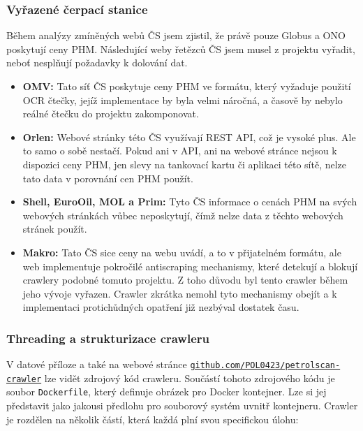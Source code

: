 \subsubsection{Vyřazené čerpací stanice}

Během analýzy zmíněných webů ČS jsem zjistil, že právě pouze Globus
a ONO poskytují ceny PHM. Následující weby řetězců ČS jsem musel
z projektu vyřadit, neboť nesplňují požadavky k dolování dat.

\begin{itemize}
    \item \textbf{OMV:} Tato síť ČS poskytuje ceny PHM ve formátu,
        který vyžaduje použití OCR čtečky, jejíž implementace
        by byla velmi náročná, a časově by nebylo reálné čtečku
        do projektu zakomponovat.
    \item \textbf{Orlen:} Webové stránky této ČS využívají REST API,
        což je vysoké plus. Ale to samo o sobě nestačí. Pokud ani
        v API, ani na webové stránce nejsou k dispozici ceny PHM,
        jen slevy na tankovací kartu či aplikaci této sítě, nelze
        tato data v porovnání cen PHM použít.
    \item \textbf{Shell, EuroOil, MOL a Prim:} Tyto ČS informace
        o cenách PHM na svých webových stránkách vůbec neposkytují,
        čímž nelze data z těchto webových stránek použít.
    \item \textbf{Makro:} Tato ČS sice ceny na webu uvádí, a to
        v přijatelném formátu, ale web implementuje pokročilé
        antiscraping mechanismy, které detekují a blokují crawlery
        podobné tomuto projektu. Z toho důvodu byl tento crawler
        během jeho vývoje vyřazen. Crawler zkrátka nemohl tyto
        mechanismy obejít a k implementaci protichůdných opatření
        již nezbýval dostatek času.
\end{itemize}

\subsubsection{Threading a strukturizace crawleru}

V datové příloze a také na webové stránce
\texttt{\url{github.com/POL0423/petrolscan-crawler}} lze vidět zdrojový
kód crawleru. Součástí tohoto zdrojového kódu je soubor \texttt{Dockerfile},
který definuje obrázek pro Docker kontejner. Lze si jej představit jako jakousi
předlohu pro souborový systém uvnitř kontejneru. Crawler je rozdělen na několik
částí, která každá plní svou specifickou úlohu:

